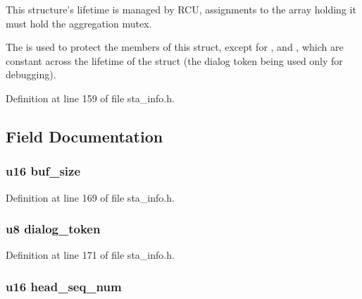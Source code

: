 This structure's lifetime is managed by R\-C\-U, assignments to the array holding it must hold the aggregation mutex.

The  is used to protect the members of this struct, except for ,  and , which are constant across the lifetime of the struct (the dialog token being used only for debugging). 

Definition at line 159 of file sta\-\_\-info.\-h.



\subsection{Field Documentation}
\hypertarget{structtid__ampdu__rx_a90486436f413e5f94517020f841025d2}{
\subsubsection[{buf\-\_\-size}]{\setlength{\rightskip}{0pt plus 5cm}u16 buf\-\_\-size}}\label{structtid__ampdu__rx_a90486436f413e5f94517020f841025d2}


Definition at line 169 of file sta\-\_\-info.\-h.

\hypertarget{structtid__ampdu__rx_a6ad691d9e8c744adc654ff53c98502d2}{
\subsubsection[{dialog\-\_\-token}]{\setlength{\rightskip}{0pt plus 5cm}u8 dialog\-\_\-token}}\label{structtid__ampdu__rx_a6ad691d9e8c744adc654ff53c98502d2}


Definition at line 171 of file sta\-\_\-info.\-h.

\hypertarget{structtid__ampdu__rx_a785baa393ccdd0e322afa926c211c5d5}{
\subsubsection[{head\-\_\-seq\-\_\-num}]{\setlength{\rightskip}{0pt plus 5cm}u16 head\-\_\-seq\-\_\-num}}\label{structtid__ampdu__rx_a785baa393ccdd0e322afa926c211c5d5}


